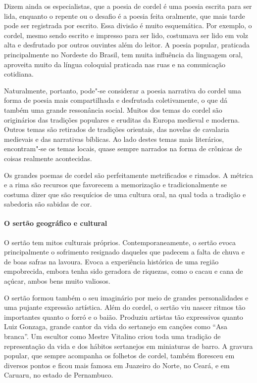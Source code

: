 \documentclass[11pt]{extarticle}
\begin{document}
Dizem ainda os especialistas, que a poesia de cordel é uma poesia escrita para
ser lida, enquanto o repente ou o desafio é a poesia feita oralmente, que mais tarde pode
ser registrada por escrito. Essa divisão é muito esquemática. Por exemplo, o
cordel, mesmo sendo escrito e impresso para ser lido, costumava ser lido em
volz alta e desfrutado por outros ouvintes além do leitor. A poesia popular,
praticada principalmente no Nordeste do Brasil, tem muita influência da
linguagem oral, aproveita muito da língua coloquial praticada nas ruas e na
comunicação cotidiana. 

Naturalmente, portanto, pode"-se considerar a poesia narrativa do cordel uma
forma de poesia mais compartilhada e desfrutada coletivamente, o que dá também
uma grande ressonância social. Muitos dos temas do cordel são originários das
tradições populares e eruditas da Europa medieval e moderna. Outros temas são
retirados de tradições orientais, das novelas de cavalaria medievais e das narrativas
bíblicas. Ao lado destes temas mais literários, encontram"-se os temas locais,
quase sempre narrados na forma de crônicas de coisas realmente acontecidas.

Os grandes poemas de cordel são perfeitamente metrificados e rimados. A métrica
e a rima são recursos que favorecem a memorização e tradicionalmente se costuma
dizer que são resquícios de uma cultura oral, na qual toda a tradição e
sabedoria são sabidas de cor.  


\paragraph{O sertão geográfico e cultural}

O sertão tem mitos culturais próprios. Contemporaneamente, o sertão evoca
principalmente o sofrimento resignado daqueles que padecem a falta de chuva e
de boas safras na lavoura. Evoca a experiência histórica de uma região
empobrecida, embora tenha sido geradora de riquezas, como o cacau e cana de
açúcar, ambos bens muito valiosos. 

O sertão formou também o seu imaginário por meio de grandes personalidades e
uma pujante expressão artística. Além do cordel, o sertão viu nascer ritmos tão
importantes quanto o forró e o baião. Produziu artistas tão expressivos quanto
Luiz Gonzaga, grande cantor da vida do sertanejo em canções como “Asa branca”.
Um escultor como Mestre Vitalino criou toda uma tradição de representação da
vida e dos hábitos sertanejos em miniaturas de barro. A gravura popular, que
sempre acompanha os folhetos de cordel, também floresceu em diversos pontos e
ficou mais famosa em Juazeiro do Norte, no Ceará, e em Caruaru, no estado de
Pernambuco. 
\end{document}
